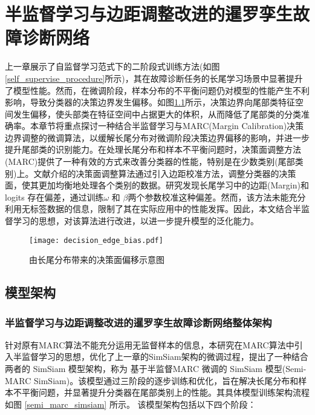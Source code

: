 \documentclass[master]{thesis-uestc}
\begin{document}
\chapter{半监督学习与边距调整改进的暹罗孪生故障诊断网络}
上一章展示了自监督学习范式下的二阶段式训练方法(如图\ref{self_supervise_procedure}所示)，其在故障诊断任务的长尾学习场景中显著提升了模型性能。然而，在微调阶段，样本分布的不平衡问题仍对模型的性能产生不利影响，导致分类器的决策边界发生偏移。如图\ref{decision_edge_bias}所示，决策边界向尾部类特征空间发生偏移，使头部类在特征空间中占据更大的体积，从而降低了尾部类的分类准确率。本章节将重点探讨一种结合半监督学习与MARC(Margin Calibration)决策边界调整的微调算法，以缓解长尾分布对微调阶段决策边界偏移的影响，并进一步提升尾部类的识别能力。在处理长尾分布和样本不平衡问题时，决策面调整方法(MARC)提供了一种有效的方式来改善分类器的性能，特别是在少数类别(尾部类别)上。文献\cite{wang2023margin}介绍的决策面调整算法通过引入边距校准方法，调整分类器的决策面，使其更加均衡地处理各个类别的数据。研究发现长尾学习中的边距(Margin)和 logits 存在偏差，通过训练$\omega$ 和 $\beta$两个参数校准这种偏差。然而，该方法未能充分利用无标签数据的信息，限制了其在实际应用中的性能发挥。因此，本文结合半监督学习的思想，对该算法进行改进，以进一步提升模型的泛化能力。
\begin{figure}[h]
    \centering
    \texttt{[image: decision\_edge\_bias.pdf]}
    \caption{由长尾分布带来的决策面偏移示意图}
    \label{decision_edge_bias}
\end{figure}
\FloatBarrier  %

\section{模型架构}
\FloatBarrier  %
\subsection{半监督学习与边距调整改进的暹罗孪生故障诊断网络整体架构}

针对原有MARC算法不能充分运用无监督样本的信息，本研究在MARC算法中引入半监督学习的思想，优化了上一章的SimSiam架构的微调过程，提出了一种结合两者的 SimSiam 模型架构，称为 基于半监督MARC 微调的 SimSiam 模型(Semi-MARC SimSiam)。该模型通过三阶段的逐步训练和优化，旨在解决长尾分布和样本不平衡问题，并显著提升分类器在尾部类别上的性能。其具体模型训练架构流程如图 \ref{semi_marc_simsiam} 所示。
该模型架构包括以下四个阶段：
\end{document}
